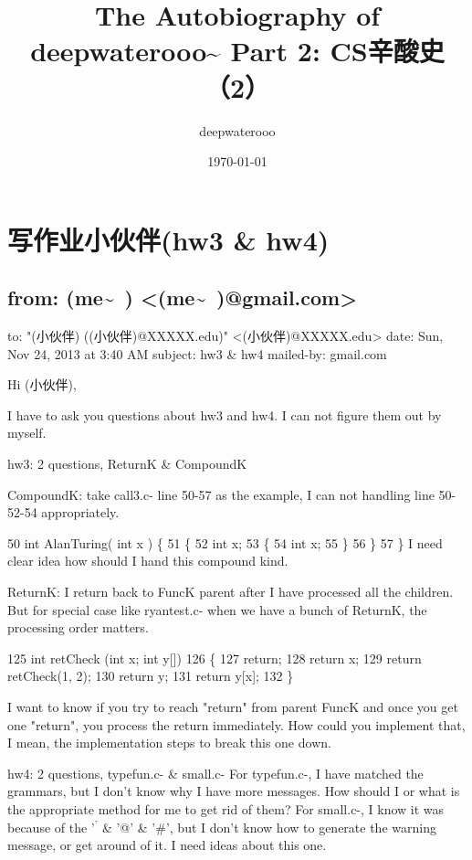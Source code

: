 \documentclass[12pt]{book}
\author{deepwaterooo}
\date{\today}
\title{The Autobiography of deepwaterooo\textasciitilde{} \linebreak Part 2: CS辛酸史（2）}
\begin{document}
\maketitle
\tableofcontents


\chapter{写作业小伙伴(hw3 \& hw4)}
\label{sec-1}

\section{from:         (me\textasciitilde{}~) <(me\textasciitilde{}~)@gmail.com>}
\label{sec-1-1}
to:         "(小伙伴) ((小伙伴)@XXXXX.edu)" <(小伙伴)@XXXXX.edu>
date:         Sun, Nov 24, 2013 at 3:40 AM
subject:         hw3 \& hw4
mailed-by:         gmail.com

Hi (小伙伴), 

I have to ask you questions about hw3 and hw4. I can not figure them out by myself. 

hw3:  2 questions, ReturnK \& CompoundK

CompoundK: take call3.c- line 50-57 as the example, I can not handling line 50-52-54 appropriately.

50 int AlanTuring( int x ) \{
51     \{
52         int x;
53         \{
54              int x;
55         \}
56     \}
57 \}
I need clear idea how should I hand this compound kind. 

ReturnK: I return back to FuncK parent after I have processed all the children. But for special case like ryantest.c- when we have a bunch of ReturnK, the processing order matters. 

125 int retCheck (int x; int y[])
126 \{
127     return;
128     return x;
129     return retCheck(1, 2);
130     return y;
131     return y[x];
132 \}

I want to know if you try to reach "return" from parent FuncK and once you get one "return", you process the return immediately. How could you implement that, I mean, the implementation steps to break this one down. 

hw4:  2 questions, typefun.c- \& small.c-
For typefun.c-, I have matched the grammars, but I don't know why I have more messages. How should I or what is the appropriate method for me to get rid of them?
For small.c-, I know it was because of the '$^{\text{'}}$ \& '@' \& '\#', but I don't know how to generate the warning message, or get around of it. I need ideas about this one. 
\end{document}

